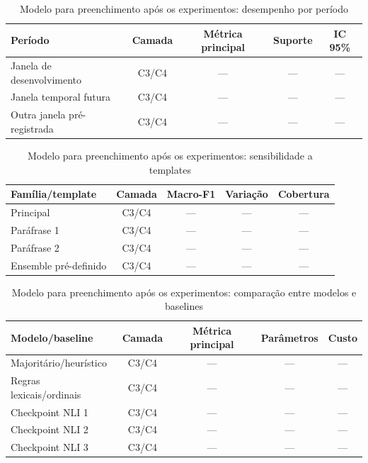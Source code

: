 \begin{table}[htbp]
\centering
\caption{Modelo para preenchimento após os experimentos: desempenho por período}
\label{tab:resultados-periodo}
\begin{tabular}{|l|c|c|c|c|}
\hline
\textbf{Período} & \textbf{Camada} & \textbf{Métrica principal} & \textbf{Suporte} & \textbf{IC 95\%} \\
\hline
Janela de desenvolvimento & C3/C4 & --- & --- & --- \\
\hline
Janela temporal futura & C3/C4 & --- & --- & --- \\
\hline
Outra janela pré-registrada & C3/C4 & --- & --- & --- \\
\hline
\end{tabular}
\end{table}

\begin{table}[htbp]
\centering
\caption{Modelo para preenchimento após os experimentos: sensibilidade a templates}
\label{tab:resultados-template}
\begin{tabular}{|l|c|c|c|c|}
\hline
\textbf{Família/template} & \textbf{Camada} & \textbf{Macro-F1} & \textbf{Variação} & \textbf{Cobertura} \\
\hline
Principal & C3/C4 & --- & --- & --- \\
\hline
Paráfrase 1 & C3/C4 & --- & --- & --- \\
\hline
Paráfrase 2 & C3/C4 & --- & --- & --- \\
\hline
Ensemble pré-definido & C3/C4 & --- & --- & --- \\
\hline
\end{tabular}
\end{table}

\begin{table}[htbp]
\centering
\caption{Modelo para preenchimento após os experimentos: comparação entre modelos e baselines}
\label{tab:resultados-modelo}
\begin{tabular}{|p{}|c|c|c|c|}
\hline
\textbf{Modelo/baseline} & \textbf{Camada} & \textbf{Métrica principal} & \textbf{Parâmetros} & \textbf{Custo} \\
\hline
Majoritário/heurístico & C3/C4 & --- & --- & --- \\
\hline
Regras lexicais/ordinais & C3/C4 & --- & --- & --- \\
\hline
Checkpoint NLI 1 & C3/C4 & --- & --- & --- \\
\hline
Checkpoint NLI 2 & C3/C4 & --- & --- & --- \\
\hline
Checkpoint NLI 3 & C3/C4 & --- & --- & --- \\
\hline
\end{tabular}
\end{table}

